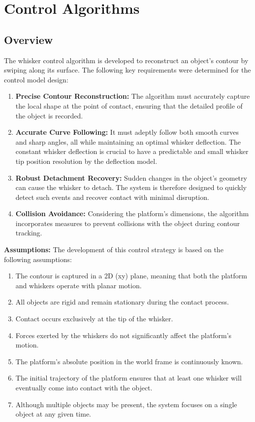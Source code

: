 

\chapter{Control Algorithms}


\section{Overview}

The whisker control algorithm is developed to reconstruct an object's contour by swiping along its surface.
The following key requirements were determined for the control model design:

\begin{enumerate}
    \item \textbf{Precise Contour Reconstruction:} The algorithm must accurately capture the local shape at the point of contact, ensuring that the detailed profile of the object is recorded.
    \item \textbf{Accurate Curve Following:} It must adeptly follow both smooth curves and sharp angles, all while maintaining an optimal whisker deflection. The constant whisker deflection is crucial to have a predictable and small whisker tip position resolution by the deflection model.
    \item \textbf{Robust Detachment Recovery:} Sudden changes in the object's geometry can cause the whisker to detach. The system is therefore designed to quickly detect such events and recover contact with minimal disruption.
    \item \textbf{Collision Avoidance:} Considering the platform's dimensions, the algorithm incorporates measures to prevent collisions with the object during contour tracking.
\end{enumerate}

\noindent \textbf{Assumptions:} The development of this control strategy is based on the following assumptions:
\begin{enumerate}
    \item The contour is captured in a 2D (xy) plane, meaning that both the platform and whiskers operate with planar motion.
    \item All objects are rigid and remain stationary during the contact process.
    \item Contact occurs exclusively at the tip of the whisker.
    \item Forces exerted by the whiskers do not significantly affect the platform's motion.
    \item The platform's absolute position in the world frame is continuously known.
    \item The initial trajectory of the platform ensures that at least one whisker will eventually come into contact with the object.
    \item Although multiple objects may be present, the system focuses on a single object at any given time.
\end{enumerate}


